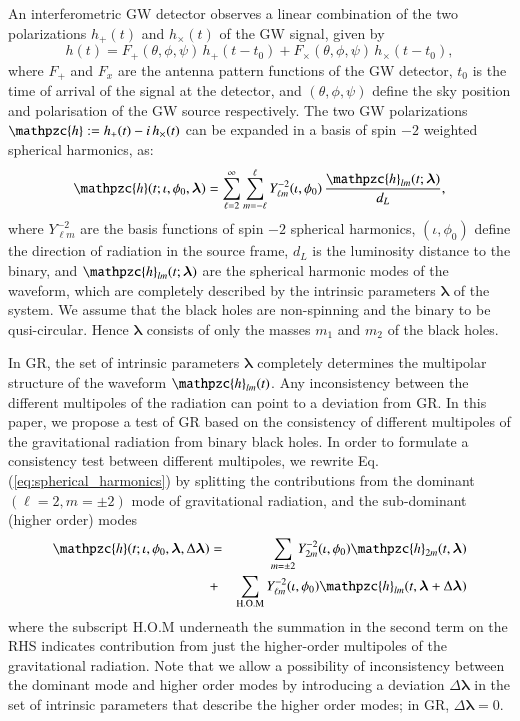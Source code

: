 \documentclass[prl,preprintnumbers,twocolumn,eqsecnum,floatfix,a4paper,nofootinbib,superscriptaddress]{revtex4}
\newcommand{\h}{\mathpzc{h}}
\newcommand{\Ylm}{{Y}^{-2}_{\ell m}}
\newcommand{\blambda}{\bm{\lambda}}
\begin{document}
An interferometric GW detector observes a linear combination of the two polarizations $h_+(t)$ and $h_\times(t)$ of the GW signal, given by 
\begin{equation}
h(t) = F_+(\theta, \phi, \psi) \, h_+(t-t_0) + F_{\times}(\theta, \phi, \psi)\, {h}_{\times}(t-t_0), 
\label{eq:det_response}
\end{equation}
where $F_+$ and $F_x$ are the antenna pattern functions of the GW detector, $t_0$ is the time of arrival of the signal at the detector, and $(\theta, \phi, \psi)$ define the sky position and polarisation of the GW source respectively. The two GW polarizations $\h := h_+(t) - i \, h_\times(t)$ can be expanded in a basis of spin $-2$ weighted spherical harmonics, as:
\begin{equation}
\h(t; \iota, \phi_0, \blambda) = \sum _{\ell=2}^{\infty} \sum _{m=-\ell}^{\ell} \Ylm (\iota, \phi_0) \, \frac{{\h}_{lm}(t; \blambda)}{d_L}, 
\label{eq:spherical_harmonics}
\end{equation}
where $\Ylm$ are the basis functions of spin $-2$ spherical harmonics, $(\iota, \phi_0)$ define the direction of radiation in the source frame, $d_L$ is  the luminosity distance to the binary, and ${\h}_{lm}(t; \blambda)$ are the spherical harmonic modes of the waveform, which are completely described by the intrinsic parameters $\blambda$ of the system. We assume that the black holes are non-spinning and the binary to be qusi-circular. Hence $\blambda$ consists of only the masses $m_1$ and $m_2$ of the black holes. 

In GR, the set of intrinsic parameters $\blambda$ completely determines the multipolar structure of the waveform ${\h}_{lm}(t)$. Any inconsistency between the different multipoles of the radiation can point to a deviation from GR. In this paper, we propose a test of GR based on the consistency of different multipoles of the gravitational radiation from binary black holes. In order to formulate a consistency test between different multipoles, we rewrite Eq.(\ref{eq:spherical_harmonics}) by splitting the contributions from the dominant $(\ell = 2, m = \pm 2)$ mode of gravitational radiation, and the sub-dominant (higher order) modes 
\begin{eqnarray}
\h(t; \iota, \phi_0, \blambda, \Delta \blambda) & = & \sum_{m = \pm2} Y^{-2}_{2m} (\iota, \phi_0) {\h}_{2m}(t, \blambda)  \nonumber \\ 
 & + & \sum _{\text{H.O.M}} \Ylm (\iota, \phi_0) \h_{lm}(t, \blambda+\Delta \blambda)
\label{eq:test_HM}
\end{eqnarray}
where the subscript H.O.M underneath the summation in the second term on the RHS indicates contribution from just the higher-order multipoles of the gravitational radiation. Note that we allow a possibility of inconsistency between the dominant mode and higher order modes by introducing a deviation $\Delta \blambda$ in the set of intrinsic parameters that describe the higher order modes; in GR,  $\Delta \blambda = 0$. 
\end{document}
